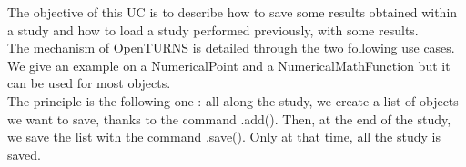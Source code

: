 The objective of this UC is to describe how to save some results obtained within a study and how to load a study performed previously, with some results.\\

The mechanism of OpenTURNS is detailed through the two following use cases. We give an example on a NumericalPoint and a NumericalMathFunction but it can be used for most objects.\\

The principle is the following one : all along the study, we create a list of objects we want to save, thanks to the command .add(). Then, at the end of the study, we save the list with the command .save(). Only at that time, all the study is saved.



\newpage 
